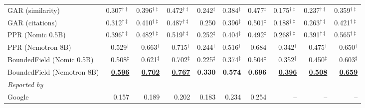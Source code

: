 \begin{table}[t]
\begin{subtable}{\textwidth}
\begin{tabular}{lrrrrrrrrr}
GAR (similarity) & 0.307$^{\dagger\ddagger}$ & 0.396$^{\dagger\ddagger}$ & 0.472$^{\dagger\ddagger}$ & 0.242$^{\ddagger}$ & 0.384$^{\ddagger}$ & 0.477$^{\ddagger}$ & 0.175$^{\dagger\ddagger}$ & 0.237$^{\dagger\ddagger}$ & 0.359$^{\dagger\ddagger}$ \\
GAR (citations) & 0.312$^{\dagger\ddagger}$ & 0.410$^{\dagger\ddagger}$ & 0.487$^{\dagger\ddagger}$ & 0.250 & 0.396$^{\ddagger}$ & 0.501$^{\ddagger}$ & 0.188$^{\dagger\ddagger}$ & 0.263$^{\dagger\ddagger}$ & 0.421$^{\dagger\ddagger}$ \\
PPR (Nomic 0.5B) & 0.396$^{\dagger\ddagger}$ & 0.482$^{\dagger\ddagger}$ & 0.519$^{\dagger\ddagger}$ & 0.252$^{\ddagger}$ & 0.404$^{\ddagger}$ & 0.492$^{\ddagger}$ & 0.268$^{\dagger\ddagger}$ & 0.391$^{\dagger\ddagger}$ & 0.565$^{\dagger\ddagger}$ \\
PPR (Nemotron 8B) & 0.529$^{\ddagger}$ & 0.663$^{\ddagger}$ & 0.715$^{\ddagger}$ & 0.244$^{\ddagger}$ & 0.516$^{\ddagger}$ & 0.684 & 0.342$^{\ddagger}$ & 0.475$^{\ddagger}$ & 0.650$^{\ddagger}$ \\
\midrule
BoundedField (Nomic 0.5B) & 0.508$^{\ddagger}$ & 0.621$^{\ddagger}$ & 0.702$^{\ddagger}$ & 0.225$^{\ddagger}$ & 0.374$^{\ddagger}$ & 0.504$^{\ddagger}$ & 0.352$^{\ddagger}$ & 0.450$^{\ddagger}$ & 0.603$^{\ddagger}$ \\
BoundedField (Nemotron 8B) & \underline{\textbf{0.596}} & \underline{\textbf{0.702}} & \underline{\textbf{0.767}} & \textbf{0.330} & \textbf{0.574} & \textbf{0.696} & \underline{\textbf{0.396}} & \underline{\textbf{0.508}} & \underline{\textbf{0.659}} \\
\midrule
\multicolumn{10}{l}{\textit{Reported by \citet{he2025pasa}}} \\
Google & 0.157 & 0.189 & 0.202 & 0.183 & 0.234 & 0.254 & -- & -- & -- \\

\end{tabular}
\end{subtable}
\end{table}
